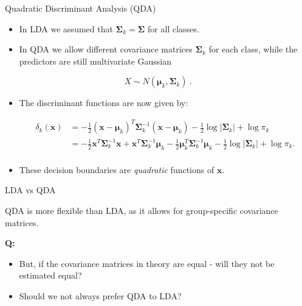\documentclass[10pt,ignorenonframetext,]{beamer}
\providecommand{\tightlist}{%
  \setlength{\itemsep}{0pt}\setlength{\parskip}{0pt}}
\begin{document}
\begin{frame}{Quadratic Discriminant Analysis (QDA)}

\begin{itemize}
\item
  In LDA we assumed that \(\boldsymbol{\Sigma}_k = \boldsymbol{\Sigma}\)
  for all classes.
\item
  In QDA we allow different covariance matrices
  \(\boldsymbol{\Sigma}_k\) for each class, while the predictors are
  still multivariate Gaussian
\end{itemize}

\[X \sim N(\boldsymbol{\mu}_k, \boldsymbol{\Sigma}_k) \ .\]

\begin{itemize}
\tightlist
\item
  The discriminant functions are now given by: \vspace{-3mm}

  \begin{align*} \delta_k({\boldsymbol x}) &= -\frac{1}{2}({\boldsymbol x}-\boldsymbol{\mu}_k)^T \boldsymbol{\Sigma}_k^{-1}({\boldsymbol x}-\boldsymbol{\mu}_k)-\frac{1}{2}\log |\boldsymbol{\Sigma}_k| + \log \pi_k \\ 
  &= -\frac{1}{2} {\boldsymbol x}^T \boldsymbol{\Sigma}_k^{-1}{\boldsymbol x} + {\boldsymbol x}^T \boldsymbol{\Sigma}_k^{-1}\boldsymbol{\mu}_k - \frac{1}{2} \boldsymbol{\mu}_k^T \boldsymbol{\Sigma}_k^{-1}\boldsymbol{\mu}_k - \frac{1}{2}\log |\boldsymbol{\Sigma}_k | + \log \pi_k.\\
  \end{align*}
\item
  These decision boundaries are \emph{quadratic} functions of
  \({\boldsymbol x}\).
\end{itemize}

\end{frame}

\begin{frame}

\begin{block}{LDA vs QDA}

\vspace{2mm}

QDA is more flexible than LDA, as it allows for group-specific
covariance matrices.

\vspace{4mm}

\textbf{Q:}

\begin{itemize}
\tightlist
\item
  But, if the covariance matrices in theory are equal - will they not be
  estimated equal?
\item
  Should we not always prefer QDA to LDA?
\end{itemize}

\end{block}

\end{frame}
\end{document}
